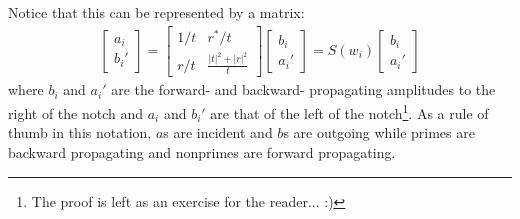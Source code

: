 \documentclass[10pt, letter, oneside,graphicx]{article}
\begin{document}
\newcommand{\x}{2.5}
\newcommand{\y}{1}
\newcommand{\yp}{.55}
\newcommand{\aw}{.75}
\newcommand{\yt}{1.6}
\newcommand{\xt}{.4}
\newcommand{\xtt}{.25}
\begin{center}
\end{center}
Notice that this can be represented by a matrix:
\begin{align*}
\left[ \begin{array}{c}
a_i \\ b_i'
\end{array} \right]
=
\left[ \begin{array}{cc}
1/t & r^*/t \\
r/t & \frac{|t|^2 + |r|^2}{t}
\end{array} \right]
\left[ \begin{array}{c}
b_i \\ a_i'
\end{array} \right]
=
S(w_i)
\left[ \begin{array}{c}
b_i \\ a_i'
\end{array} \right]
\end{align*}
where $b_i$ and $a_i'$ are the forward- and backward- propagating amplitudes to the right of the notch and $a_i$ and $b_i'$ are that of the left of the notch\footnote{The proof is left as an exercise for the reader... :)}. As a rule of thumb in this notation, $a$s are incident and $b$s are outgoing while primes are backward propagating and nonprimes are forward propagating.
\end{document}
